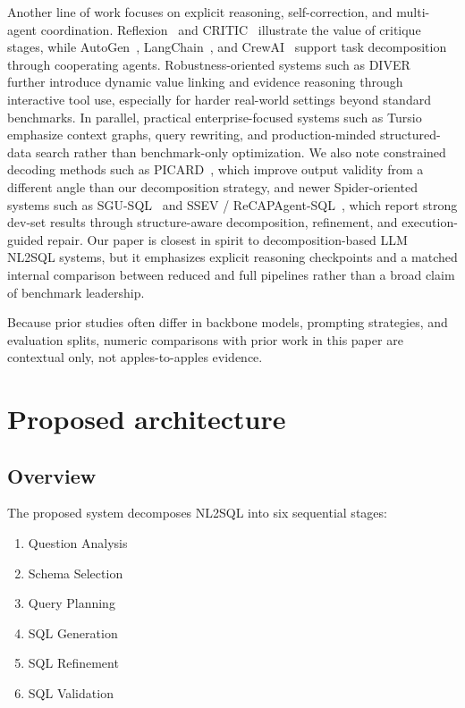 Another line of work focuses on explicit reasoning, self-correction, and multi-agent coordination. Reflexion~\cite{shinn2023reflexion} and CRITIC~\cite{gou2024critic} illustrate the value of critique stages, while AutoGen~\cite{wang2023autogen}, LangChain~\cite{chase2024langchain}, and CrewAI~\cite{moura2024crewai} support task decomposition through cooperating agents. Robustness-oriented systems such as DIVER~\cite{chen2026diver} further introduce dynamic value linking and evidence reasoning through interactive tool use, especially for harder real-world settings beyond standard benchmarks. In parallel, practical enterprise-focused systems such as Tursio~\cite{naveed2026tursio} emphasize context graphs, query rewriting, and production-minded structured-data search rather than benchmark-only optimization. We also note constrained decoding methods such as PICARD~\cite{scholak2021picard}, which improve output validity from a different angle than our decomposition strategy, and newer Spider-oriented systems such as SGU-SQL~\cite{cao2024sgusql} and SSEV / ReCAPAgent-SQL~\cite{lv2026llmsqlvoting}, which report strong dev-set results through structure-aware decomposition, refinement, and execution-guided repair. Our paper is closest in spirit to decomposition-based LLM NL2SQL systems, but it emphasizes explicit reasoning checkpoints and a matched internal comparison between reduced and full pipelines rather than a broad claim of benchmark leadership.

Because prior studies often differ in backbone models, prompting strategies, and evaluation splits, numeric comparisons with prior work in this paper are contextual only, not apples-to-apples evidence.

\section{Proposed architecture}\label{sec:arch}

\subsection{Overview}\label{subsec:arch-overview}

The proposed system decomposes NL2SQL into six sequential stages:
\begin{enumerate}
  \item Question Analysis
  \item Schema Selection
  \item Query Planning
  \item SQL Generation
  \item SQL Refinement
  \item SQL Validation
\end{enumerate}

